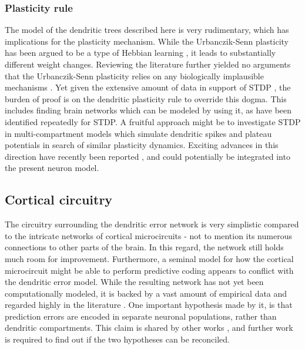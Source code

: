 \subsubsection*{Plasticity rule}

The model of the dendritic trees described here is very rudimentary, which has implications for the plasticity
mechanism. While the Urbanczik-Senn plasticity has been argued to be a type of Hebbian learning
\citep{gerstner2018eligibility,urbanczik2014learning}, it leads to substantially different weight changes. Reviewing the
literature further yielded no arguments that the Urbanczik-Senn plasticity relies on any biologically implausible
mechanisms
\citep{magee2020synaptic,Lillicrap2020,Poirazi2020,sacramento2018dendritic,guerguiev2017towards,Marblestone2016}. Yet
given the extensive amount of data in support of STDP
\citep{magee2020synaptic,gerstner2018eligibility,Bengio2015,Marblestone2016}, the burden of proof is on the dendritic
plasticity rule to override this dogma. This includes finding brain networks which can be modeled by using it, as have
been identified repeatedly for STDP. A fruitful approach might be to investigate STDP in multi-compartment models which
simulate dendritic spikes and plateau potentials in search of similar plasticity dynamics. Exciting advances in this
direction have recently been reported \citep{Bono2017,Schiess2016,magee2020synaptic}, and could potentially be
integrated into the present neuron model.


\subsection*{Cortical circuitry}

The circuitry surrounding the dendritic error network is very simplistic compared to the intricate networks of cortical
microcircuits - not to mention its numerous connections to other parts of the brain. In this regard, the network still
holds much room for improvement. Furthermore, a seminal model for how the cortical microcircuit might be able to perform
predictive coding \citep{bastos2012canonical} appears to conflict with the dendritic error model. While the resulting
network has not yet been computationally modeled, it is backed by a vast amount of empirical data and regarded highly in
the literature \citep{Lillicrap2020,Park2013,whittington2019theories}. One important hypothesis made by it, is that prediction errors are encoded in separate neuronal
populations, rather than dendritic compartments. This claim is shared by other works
\citep{Hertaeg2022,Whittington2017}, and further work is required to find out if the two hypotheses can be reconciled.

